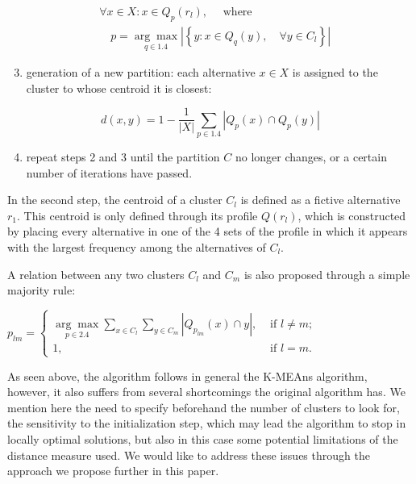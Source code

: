 \documentclass[10pt]{article}
\begin{document}
$$
\begin{aligned}
& \forall x \in X: x \in Q_{p}\left(r_{l}\right), \quad \text { where } \\
& \quad p=\underset{q \in 1.4}{\arg \max }\left|\left\{y: x \in Q_{q}(y), \quad \forall y \in C_{l}\right\}\right|
\end{aligned}
$$

\begin{enumerate}
  \setcounter{enumi}{2}
  \item generation of a new partition: each alternative $x \in X$ is assigned to the cluster to whose centroid it is closest:
\end{enumerate}

$$
d(x, y)=1-\frac{1}{|X|} \sum_{p \in 1.4}\left|Q_{p}(x) \cap Q_{p}(y)\right|
$$

\begin{enumerate}
  \setcounter{enumi}{3}
  \item repeat steps 2 and 3 until the partition $C$ no longer changes, or a certain number of iterations have passed.
\end{enumerate}

In the second step, the centroid of a cluster $C_{l}$ is defined as a fictive alternative $r_{1}$. This centroid is only defined through its profile $Q\left(r_{l}\right)$, which is constructed by placing every alternative in one of the 4 sets of the profile in which it appears with the largest frequency among the alternatives of $C_{l}$.

A relation between any two clusters $C_{l}$ and $C_{m}$ is also proposed through a simple majority rule:

$p_{l m}= \begin{cases}\underset{p \in 2.4}{\arg \max } \sum_{x \in C_{l}} \sum_{y \in C_{m}}\left|Q_{p_{l m}}(x) \cap y\right|, & \text { if } l \neq m ; \\ 1, & \text { if } l=m .\end{cases}$

As seen above, the algorithm follows in general the K-MEAns algorithm, however, it also suffers from several shortcomings the original algorithm has. We mention here the need to specify beforehand the number of clusters to look for, the sensitivity to the initialization step, which may lead the algorithm to stop in locally optimal solutions, but also in this case some potential limitations of the distance measure used. We would like to address these issues through the approach we propose further in this paper.
\end{document}

